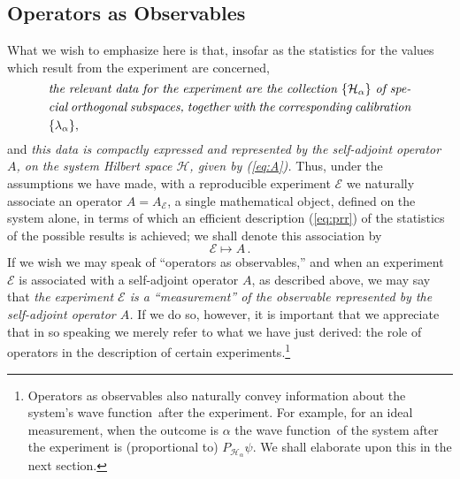 \documentclass[12pt]{article}
\newcommand{\eq}[1]{(\ref{#1})}
\newcommand{\sa}{self-adjoint}
\newcommand{\wf}{wave function}
\renewcommand{\a}{\alpha}
\newcommand{\la}{\lambda_{\a}}
\newcommand{\Ha}{{\H}_{\a}}
\renewcommand{\H}{\mbox{$\mathcal{H}$}}
\newcommand{\E}{\mbox{$\mathscr{E}$}}
\begin{document}
\subsection{Operators as Observables}\label{subsec.oao}

What we wish to emphasize here is that, insofar as the statistics for
the values which result {}from the experiment are concerned,
\begin{equation}
\mbox{%
\begin{minipage}{0.85\textwidth}\openup 1.4\jot
   \setlength{\baselineskip}{12pt}\emph{the relevant data for the
     experiment are the collection $\{ \Ha\}$ of special orthogonal
     subspaces, together with the corresponding calibration $\{\la \},$
   }
\end{minipage}}
\label{def:exptoa}
\end{equation}
and \emph{this data is compactly expressed and represented by the
   self-adjoint operator $A$, on the system Hilbert space $\H$, given
   by \eq{eq:A}.} Thus, under the assumptions we have made, with a
reproducible experiment $\E$ we naturally associate an operator
$A=A_{\E}$, a single mathematical object, defined on the system alone,
in terms of which an efficient description \eq{eq:prr} of the
statistics of the possible results is achieved; we shall denote this
association by
%
\begin{equation}
\E\mapsto A\,.
\label{eq:fretoe}
\end{equation}
If we wish we may speak of ``operators as observables,'' and when an
experiment \E{} is associated with a \sa{} operator $A$, as described
above, we may say that \emph{the experiment \E{} is a ``measurement''
   of the observable represented by the \sa{} operator $A$.} If we do
so, however, it is important that we appreciate that in so speaking we
merely refer to what we have just derived: the role of operators in
the description of certain experiments.\footnote{Operators as
   observables also naturally convey information about the system's
   \wf\ after the experiment.  For example, for an ideal measurement,
   when the outcome is $\a$ the \wf\ of the system after the experiment
   is (proportional to) $P_{\H_\a}\psi$.  We shall elaborate upon this
   in the next section.}
\end{document}
